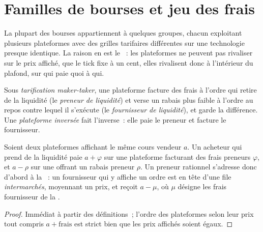 \section{Familles de bourses et jeu des frais}

La plupart des bourses appartiennent à quelques groupes, chacun exploitant plusieurs
plateformes avec des grilles tarifaires différentes sur une technologie presque identique. La raison
en est le ~: les plateformes ne peuvent pas rivaliser sur le prix affiché, que le
tick fixe à un cent, elles rivalisent donc à l'intérieur du plafond, sur qui paie quoi à qui.

\begin{definition}\label{def:m1:us-equity-market-structure:makertaker}
Sous \emph{tarification maker-taker}, une plateforme facture
des frais à l'ordre qui retire de la liquidité (le \emph{preneur de liquidité}) et verse
un rabais plus faible à l'ordre au repos contre lequel il s'exécute (le \emph{fournisseur de liquidité}),
et garde la différence. Une \emph{plateforme inversée} fait
l'inverse~: elle paie le preneur et facture le fournisseur.
\end{definition}

\begin{proposition}\label{prop:m1:us-equity-market-structure:finer}
Soient deux plateformes affichant le même cours vendeur $a$. Un acheteur qui prend de la liquidité paie
$a + \varphi$ sur une plateforme facturant des frais preneurs $\varphi$, et $a - \rho$ sur une
 offrant un rabais preneur $\rho$. Un preneur rationnel s'adresse donc d'abord à la
~: un fournisseur qui y affiche un ordre est en tête
d'une file \emph{intermarchés}, moyennant un prix, et reçoit $a - \mu$, où $\mu$ désigne
les frais fournisseur de la .
\end{proposition}
\begin{proof}
Immédiat à partir des définitions~; l'ordre des plateformes selon leur prix tout compris
$a + \text{frais}$ est strict bien que les prix affichés soient égaux.
\end{proof}

